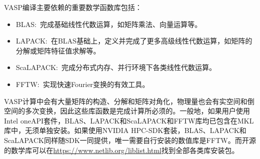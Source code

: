\textrm{VASP}编译主要依赖的重要数学函数库包括：
\begin{itemize}
	\item \textrm{BLAS}:~完成基础线性代数运算，如矩阵乘法、向量运算等。
	\item \textrm{LAPACK}:~在\textrm{BLAS}基础上，定义并完成了更多高级线性代数运算，如矩阵的分解或矩阵特征值求解等。
	\item \textrm{ScaLAPACK}:~完成分布式内存、并行环境下各类线性代数运算。
	\item \textrm{FFTW}:~实现快速\textrm{Fourier}变换的有效工具。
\end{itemize}
\textrm{VASP}计算中会有大量矩阵的构造、分解和矩阵对角化，物理量也会有实空间和倒空间的多次变换，因此这些库函数是完成计算所必须的。一般地，如果用户使用\textrm{Intel oneAPI}套件，\textrm{BLAS}、\textrm{LAPACK}和\textrm{ScaLAPACK}和\textrm{FFTW}库均已包含在\textrm{MKL}库中，无须单独安装。如果使用\textrm{NVIDIA HPC-SDK}套装，\textrm{BLAS}、\textrm{LAPACK}和\textrm{ScaLAPACK}同样随\textrm{SDK}一同提供，唯一需要自行安装的数值库是\textrm{FFTW}。而开源的数学库可以在\url{https://www.netlib.org/liblist.html}找到全部各类库安装包。


